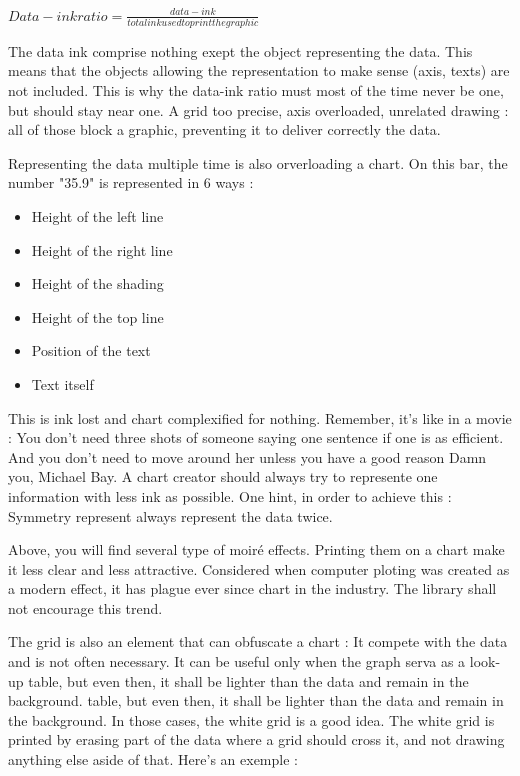 $Data-ink ratio = \frac{data-ink}{total ink used to print the graphic}$

The data ink comprise nothing exept the object representing the data. This means that the objects allowing the representation to make sense (axis, texts) are not included. 
This is why the data-ink ratio must most of the time never be one, but should stay near one.
A grid too precise, axis overloaded, unrelated drawing : all of those block a graphic, preventing it to deliver correctly the data.

Representing the data multiple time is also orverloading a chart. On this bar, the number "35.9" is represented in 6 ways :
\begin{itemize}
\item Height of the left line
\item Height of the right line
\item Height of the shading
\item Height of the top line
\item Position of the text
\item Text itself
\end{itemize}
This is ink lost and chart complexified for nothing. Remember, it's like in a movie : You don't need three shots of someone saying one sentence if one is as efficient. And you don't need to move around her unless you have a good reason 
 Damn you, Michael Bay.
 A chart creator should always try to represente one information with less ink as possible.
 One hint, in order to achieve this : Symmetry represent always represent the data twice.

Above, you will find several type of moiré effects. Printing them on a chart make it less clear and less attractive. Considered when computer ploting was created as a modern effect, it has plague ever since chart in the industry. The library shall not encourage this trend.

The grid is also an element that can obfuscate a chart : It compete with the data and is not often necessary.
 It can be useful only when the graph serva as a look-up table, but even then, it shall be lighter than the data and remain in the background. table, but even then, it shall be lighter than the data and remain in the background.
 In those cases, the white grid is a good idea. The white grid is printed by erasing part of the data where a grid should cross it, and not drawing anything else aside of that. Here's an exemple :

